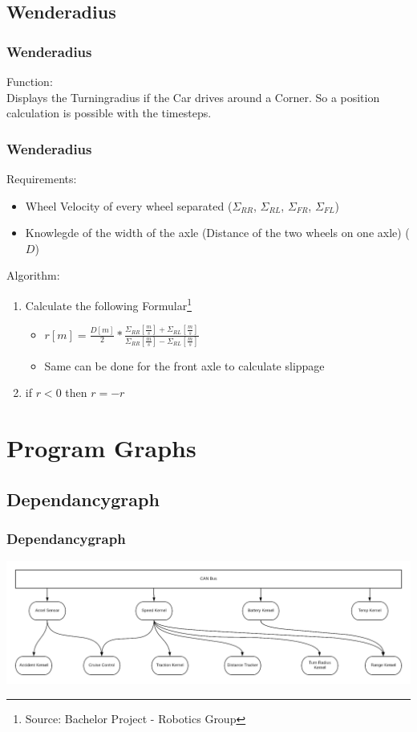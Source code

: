 \documentclass{beamer}
\begin{document}
\subsection{Wenderadius}
\begin{frame}
    \frametitle{Wenderadius}
    Function:\\
    Displays the Turningradius if the Car drives around a Corner. So a position calculation is possible with the timesteps.
\end{frame}
\begin{frame}
    \frametitle{Wenderadius}
    Requirements:
    \begin{itemize}
     \item Wheel Velocity of every wheel separated ($\Sigma_{RR}$, $\Sigma_{RL}$, $\Sigma_{FR}$, $\Sigma_{FL}$)
     \item Knowlegde of the width of the axle (Distance of the two wheels on one axle) ($D$)
    \end{itemize}
    Algorithm:
    \begin{enumerate}
     \item Calculate the following Formular\footnote{Source: Bachelor Project - Robotics Group}
     \begin{itemize}
        \item $r\left[ m \right]=\frac{D\left[ m \right]}{2}*\frac{\Sigma_{RR}\left[ \frac{m}{s} \right]+\Sigma_{RL}\left[ \frac{m}{s} \right]}{\Sigma_{RR}\left[ \frac{m}{s} \right]-\Sigma_{RL}\left[ \frac{m}{s} \right]}$
        \item Same can be done for the front axle to calculate slippage
     \end{itemize}
     \item if $r<0$ then $r=-r$
    \end{enumerate}
\end{frame}
\section{Program Graphs}
\subsection{Dependancygraph}
\begin{frame}
    \frametitle{Dependancygraph}
    \includegraphics[width=\textwidth]{res/Dependencie_Graph.png}
\end{frame}
\end{document}
